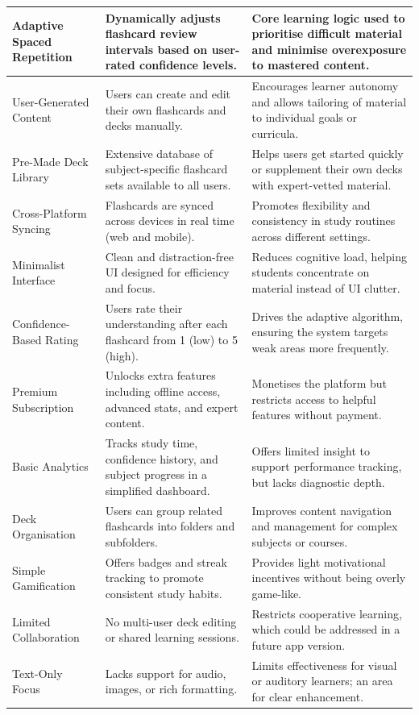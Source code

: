 \documentclass[a4paper,12pt]{article}
\begin{document}
\begin{ThreePartTable}
\begin{longtable}{|p{4cm}|p{5.8cm}|>{\raggedright\arraybackslash}p{5.8cm}|}
Adaptive Spaced Repetition & Dynamically adjusts flashcard review intervals based on user-rated confidence levels. & Core learning logic used to prioritise difficult material and minimise overexposure to mastered content. \\
\hline
User-Generated Content & Users can create and edit their own flashcards and decks manually. & Encourages learner autonomy and allows tailoring of material to individual goals or curricula. \\
\hline
Pre-Made Deck Library & Extensive database of subject-specific flashcard sets available to all users. & Helps users get started quickly or supplement their own decks with expert-vetted material. \\
\hline
Cross-Platform Syncing & Flashcards are synced across devices in real time (web and mobile). & Promotes flexibility and consistency in study routines across different settings. \\
\hline
Minimalist Interface & Clean and distraction-free UI designed for efficiency and focus. & Reduces cognitive load, helping students concentrate on material instead of UI clutter. \\
\hline
Confidence-Based Rating & Users rate their understanding after each flashcard from 1 (low) to 5 (high). & Drives the adaptive algorithm, ensuring the system targets weak areas more frequently. \\
\hline
Premium Subscription & Unlocks extra features including offline access, advanced stats, and expert content. & Monetises the platform but restricts access to helpful features without payment. \\
\hline
Basic Analytics & Tracks study time, confidence history, and subject progress in a simplified dashboard. & Offers limited insight to support performance tracking, but lacks diagnostic depth. \\
\hline
Deck Organisation & Users can group related flashcards into folders and subfolders. & Improves content navigation and management for complex subjects or courses. \\
\hline
Simple Gamification & Offers badges and streak tracking to promote consistent study habits. & Provides light motivational incentives without being overly game-like. \\
\hline
Limited Collaboration & No multi-user deck editing or shared learning sessions. & Restricts cooperative learning, which could be addressed in a future app version. \\
\hline
Text-Only Focus & Lacks support for audio, images, or rich formatting. & Limits effectiveness for visual or auditory learners; an area for clear enhancement. \\
\hline
\end{longtable}
\end{ThreePartTable}
\end{document}
